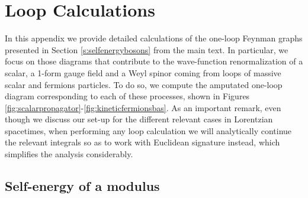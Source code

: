 \begin{comment}
Let us finally prove that every term in the asymptotic expansion of the one-loop determinant (c.f. eqs. \eqref{eq:Expfnasymptoticsodd} and \eqref{eq:Expfnasymptoticseven}) contributes roughly the same upon summation over KK modes. We focus on those terms of the form $m_n^{2k} \LQG^{d-2k}$, with $k\in \mathbb{Z}_{\geq0}$ and we have substituted $\varepsilon=\LQG^{-2}$. Then we find
%
\beq\label{eq:uniformisation}
\sum_{|n|\leq N} m_n^{2k} \LQG^{d-2k} \simeq m_{\rm KK}^{2k} \LQG^{d-2k} N^{2k+1} \simeq \LQG^d N \simeq \LQG^2 \Mpd^{d-2}\, ,
\eeq
%
where we have used $\LQG \simeq N m_{\rm KK}$ in the second step and $N \LQG^{d-2} \simeq \Mpd^{d-2}$ in the last one. (Essentially the same contribution arises when focusing on the extra logarithmic term that arises in the CW potential whenever $d \in 2\mathbb{Z}_{\geq0}$.) Therefore, we see some kind of `uniformization' of the expansion of the quantum-induced potential, in agreement with our considerations from the previous paragraph.

\end{comment}

\chapter{Loop Calculations}
\label{ap:Loops}
		
In this appendix we provide detailed calculations of the one-loop Feynman graphs presented in Section \ref{s:selfenergybosons} from the main text. In particular, we focus on those diagrams that contribute to the wave-function renormalization of a scalar, a 1-form gauge field and a Weyl spinor coming from loops of massive scalar and fermions particles. To do so, we compute the amputated one-loop diagram corresponding to each of these processes, shown in Figures \ref{fig:scalarpropagator}-\ref{fig:kineticfermionsbas}. As an important remark, even though we discuss our set-up for the different relevant cases in Lorentzian spacetimes, when performing any loop calculation we will analytically continue the relevant integrals so as to work with Euclidean signature instead, which simplifies the analysis considerably.
		
\section{Self-energy of a modulus}
\label{ap:Loopsscalar}
		
